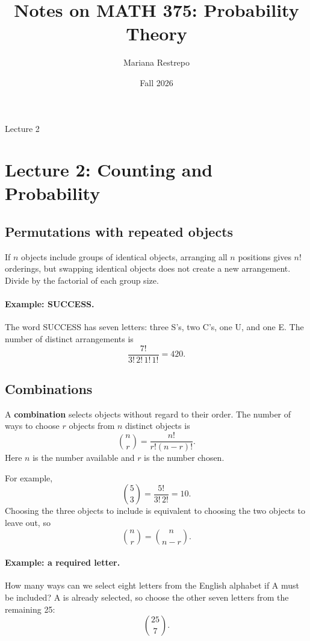 \documentclass[11pt]{article}
\title{Notes on MATH 375: Probability Theory}
\author{Mariana Restrepo}
\date{Fall 2026}
\begin{document}
\maketitle

\begin{center}
\large Lecture 2
\end{center}

\tableofcontents

\section{Lecture 2: Counting and Probability}

\subsection{Permutations with repeated objects}

If $n$ objects include groups of identical objects, arranging all
$n$ positions gives $n!$ orderings, but swapping identical objects
does not create a new arrangement. Divide by the factorial of each
group size.

\paragraph{Example: SUCCESS.}
The word SUCCESS has seven letters: three S's, two C's, one U, and
one E. The number of distinct arrangements is
\[
\frac{7!}{3!\,2!\,1!\,1!}=420.
\]

\subsection{Combinations}

A \textbf{combination} selects objects without regard to their order.
The number of ways to choose $r$ objects from $n$ distinct objects is
\[
\binom{n}{r}
=\frac{n!}{r!(n-r)!}.
\]
Here $n$ is the number available and $r$ is the number chosen.

For example,
\[
\binom{5}{3}=\frac{5!}{3!\,2!}=10.
\]
Choosing the three objects to include is equivalent to choosing the
two objects to leave out, so
\[
\binom{n}{r}=\binom{n}{n-r}.
\]

\paragraph{Example: a required letter.}
How many ways can we select eight letters from the English alphabet
if A must be included? A is already selected, so choose the other
seven letters from the remaining 25:
\[
\boxed{\binom{25}{7}}.
\]
\end{document}
